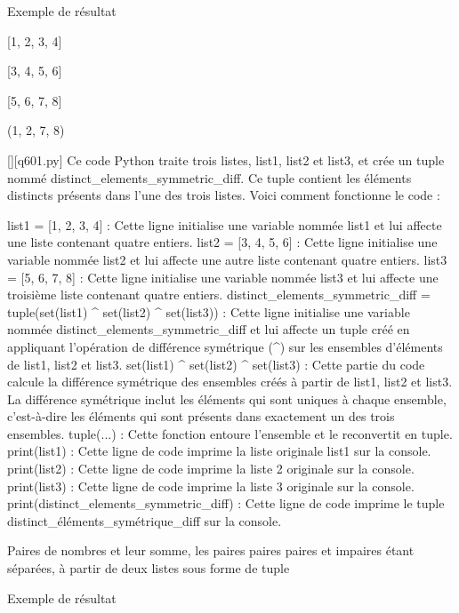 Exemple de résultat

[1, 2, 3, 4]

[3, 4, 5, 6]

[5, 6, 7, 8]

(1, 2, 7, 8)
        \par
        \begin{solution}
            \renewcommand{\nomfichier}{q601.py}
            \pythonfile{\chemincode \nomfichier}[][\nomfichier]
            Ce code Python traite trois listes, list1, list2 et list3, et crée un tuple nommé distinct_elements_symmetric_diff. Ce tuple contient les éléments distincts présents dans l'une des trois listes. Voici comment fonctionne le code :

    list1 = [1, 2, 3, 4] : Cette ligne initialise une variable nommée list1 et lui affecte une liste contenant quatre entiers.
    list2 = [3, 4, 5, 6] : Cette ligne initialise une variable nommée list2 et lui affecte une autre liste contenant quatre entiers.
    list3 = [5, 6, 7, 8] : Cette ligne initialise une variable nommée list3 et lui affecte une troisième liste contenant quatre entiers.
    distinct_elements_symmetric_diff = tuple(set(list1) ^ set(list2) ^ set(list3)) : Cette ligne initialise une variable nommée distinct_elements_symmetric_diff et lui affecte un tuple créé en appliquant l'opération de différence symétrique (^) sur les ensembles d'éléments de list1, list2 et list3.
        set(list1) ^ set(list2) ^ set(list3) : Cette partie du code calcule la différence symétrique des ensembles créés à partir de list1, list2 et list3. La différence symétrique inclut les éléments qui sont uniques à chaque ensemble, c'est-à-dire les éléments qui sont présents dans exactement un des trois ensembles.
        tuple(...) : Cette fonction entoure l'ensemble et le reconvertit en tuple.
    print(list1) : Cette ligne de code imprime la liste originale list1 sur la console.
    print(list2) : Cette ligne de code imprime la liste 2 originale sur la console.
    print(list3) : Cette ligne de code imprime la liste 3 originale sur la console.
    print(distinct_elements_symmetric_diff) : Cette ligne de code imprime le tuple distinct_éléments_symétrique_diff sur la console.
        \end{solution}
        

        \question
        Paires de nombres et leur somme, les paires paires paires et impaires étant séparées, à partir de deux listes sous forme de tuple

Exemple de résultat

